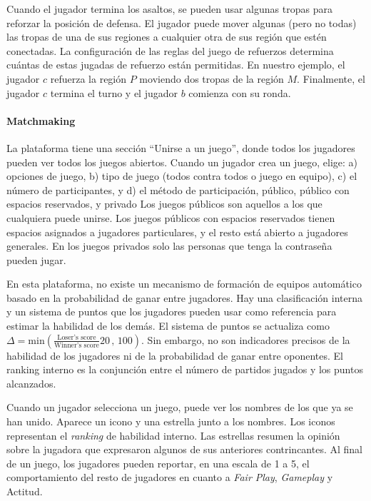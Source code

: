 \documentclass[a4paper,11pt]{book}
\theoremstyle{definition}
\begin{document}
Cuando el jugador termina los asaltos, se pueden usar algunas tropas para reforzar la posici\'on de defensa.
%
El jugador puede mover algunas (pero no todas) las tropas de una de sus regiones a cualquier otra de sus regi\'on que est\'en conectadas.
%
La configuraci\'on de las reglas del juego de refuerzos determina cu\'antas de estas jugadas de refuerzo est\'an permitidas.
%
En nuestro ejemplo, el jugador $c$ refuerza la regi\'on $P$ moviendo dos tropas de la regi\'on $M$.
%
Finalmente, el jugador $c$ termina el turno y el jugador $b$ comienza con su ronda.

\paragraph{Matchmaking}

La plataforma tiene una secci\'on ``Unirse a un juego'', donde todos los jugadores pueden ver todos los juegos abiertos.
%
Cuando un jugador crea un juego, elige: a) opciones de juego, b) tipo de juego (todos contra todos o juego en equipo), c) el n\'umero de participantes, y d) el m\'etodo de participaci\'on, p\'ublico, p\'ublico con espacios reservados, y privado
%
Los juegos p\'ublicos son aquellos a los que cualquiera puede unirse.
%
Los juegos p\'ublicos con espacios reservados tienen espacios asignados a jugadores particulares, y el resto est\'a abierto a jugadores generales.
%
En los juegos privados solo las personas que tenga la contrase\~na pueden jugar.


En esta plataforma, no existe un mecanismo de formaci\'on de equipos autom\'atico basado en la probabilidad de ganar entre jugadores.
%
Hay una clasificaci\'on interna y un sistema de puntos que los jugadores pueden usar como referencia para estimar la habilidad de los dem\'as.
%
El sistema de puntos se actualiza como {\small $\Delta = \text{min}(\frac{\text{Loser's score}}{\text{Winner's score}}20\,,\,100 )$}.
%
Sin embargo, no son indicadores precisos de la habilidad de los jugadores ni de la probabilidad de ganar entre oponentes.
%
El ranking interno es la conjunci\'on entre el n\'umero de partidos jugados y los puntos alcanzados.


Cuando un jugador selecciona un juego, puede ver los nombres de los que ya se han unido.
%
Aparece un icono y una estrella junto a los nombres.
%
Los iconos representan el \emph{ranking} de habilidad interno.
%
Las estrellas resumen la opini\'on sobre la jugadora que expresaron algunos de sus anteriores contrincantes.
%
Al final de un juego, los jugadores pueden reportar, en una escala de 1 a 5, el comportamiento del resto de jugadores en cuanto a \emph{Fair Play}, \emph{Gameplay} y Actitud.
%
\end{document}
